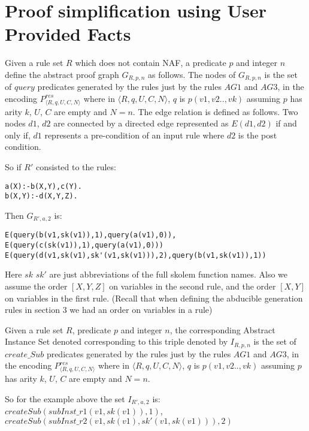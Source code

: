 \section{Proof simplification using User Provided Facts}\label{sec:proof_simplification}
\begin{definition}
Given a rule set $R$ which does not contain NAF, a predicate $p$ and integer $n$ define the abstract proof graph
$G_{R,p,n}$ as follows. The nodes of $G_{R,p,n}$ is the set of $query$
predicates generated by the rules just by the rules $AG1$ and $AG3$, in the encoding $P_{\langle R,q,U,C,N\rangle}^{res}$ where in
$\langle R,q,U,C,N\rangle$, $q$ is $p(v1,v2..,vk)$ assuming $p$ has arity $k$,
$U$, $C$ are empty and $N = n$. The edge relation is defined as follows. Two
nodes $d1$, $d2$ are connected by a directed edge represented as $E(d1,d2)$ if
and only if, $d1$ represents a pre-condition of an input rule where $d2$ is
the post condition.
\end{definition}
So if $R'$ consisted to the rules:
\begin{lstlisting}[frame=none]
a(X):-b(X,Y),c(Y).
b(X,Y):-d(X,Y,Z).
\end{lstlisting}
Then $G_{R',a,2}$ is:
\begin{lstlisting}[frame=none]
E(query(b(v1,sk(v1)),1),query(a(v1),0)),
E(query(c(sk(v1)),1),query(a(v1),0)))
E(query(d(v1,sk(v1),sk'(v1,sk(v1))),2),query(b(v1,sk(v1)),1))
\end{lstlisting}
Here $sk$ $sk'$ are just abbreviations of the full skolem function names. Also we assume the order $[X,Y,Z]$ on variables in the second rule, and the order $[X,Y]$ on variables in the first rule. (Recall that when defining the abducible generation rules in section 3 we had an order on variables in a rule)
\begin{definition}\label{absinst}
Given a rule set $R$, predicate $p$ and integer $n$, the corresponding Abstract Instance Set denoted corresponding to this triple denoted by  $I_{R,p,n}$ is the set of $create\_Sub$
predicates generated by the rules just by the rules $AG1$ and $AG3$, in the encoding $P_{\langle R,q,U,C,N\rangle}^{res}$ where in
$\langle R,q,U,C,N\rangle$, $q$ is $p(v1,v2..,vk)$ assuming $p$ has arity $k$,
$U$, $C$ are empty and $N = n$. 
\end{definition}
So for the example above the set $I_{R',a,2}$ is:\\ $createSub(subInst\_r1(v1,sk(v1)),1)$,\\ $createSub(subInst\_r2(v1,sk(v1), sk'(v1,sk(v1))),2)$ 

